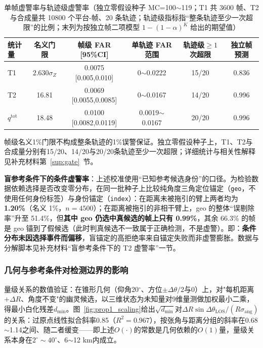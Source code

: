 \documentclass[UTF8,a4paper,zihao=-4]{ctexart}
\begin{document}
\begin{table}[htbp]
\centering
\caption{单帧虚警率与轨迹级虚警率（独立零假设种子 MC=100$\sim$119；T1 共 3600 帧、T2 与合成量共 10800 个平台-帧、20 条轨迹；轨迹级指标指“整条轨迹至少一次超限”的比例；末列为按独立帧二项模型 $1-(1-\alpha)^{K}$ 给出的期望值）}\label{tab:far}
\small
\begin{tabular}{@{}lccccc@{}}
\toprule
统计量 & 名义门限 & 帧级 FAR [95\%CI] & 单轨迹 FAR 范围 & 轨迹级$\ge1$次超限 & 独立帧预测\\
\midrule
T1 & $2.630\sigma_Z$ & 0.0075 [0.005,0.010] & 0$\sim$0.0222 & 15/20 & 0.836\\
T2 & 16.81 & 0.0069 [0.0055,0.0085] & 0$\sim$0.0167 & 14/20 & 0.996\\
$q^{\mathrm{tot}}$ & 18.48 & 0.0100 [0.0082,0.0119] & 0.0019$\sim$0.0167 & 20/20 & 0.996\\
\bottomrule
\end{tabular}
\end{table}

帧级名义1\%门限不构成整条轨迹的1\%误警保证。独立零假设种子上，T1、T2与合成量分别有15/20、14/20与20/20条轨迹至少一次超限；详细统计与相关性解释见补充材料第~\ref{sup:gate}~节。

\textbf{盲参考条件下的条件虚警率}：上述校准使用“已知参考候选身份”的口径。为检验数据依赖选择是否改变零分布，在同一批种子上比较纯角度三角定位锚定（\texttt{geo}，不使用任何身份标签）与身份锚定（\texttt{index}）：在距离未被拖引的臂上两者均为 \textbf{1.20\%}（名义 1\%，$n=4500$）；在距离被拖引的非相干臂上，geo 的整体“误剔除率”升至 51.4\%，但\textbf{其中 geo 仍选中真候选的帧上只有 0.99\%}，其余 66.3\% 的帧是 geo 锚到了假候选（此时判真候选不一致属于正确检测，不是虚警）。即：\textbf{条件分布未因选择事件而偏移}，盲锚定的高拒绝率来自锚定失败而非虚警膨胀。数据与分解脚本见补充材料“盲参考条件下的 T2 虚警率”一节。


\subsubsection{几何与参考条件对检测边界的影响}\label{sec:test-geometry}
量级关系的数值验证：在锥形几何（仰角20\(^\circ\)、方位\(\pm\Delta\theta/2\)与0）上，对"每机距离\(+\Delta R\)、角度不变"的幽灵候选，以三维状态为未知量对9维量测做加权最小二乘，得最小白化残差\(d_{\min}\)。图~\ref{fig:prop1_scaling}给出\(\sqrt{d_{\min}}\)对\(\Delta R\sin\Delta\theta_{\mathrm{LOS}}/(R\sigma_{\mathrm{ang}})\)的关系：过原点线性拟合斜率0.85（\(R^2=0.967\)），按张角与距离分组的斜率在0.68\(\sim\)1.14之间、随二者缓变——即上述\(O(\cdot)\)的常数是几何依赖的\(O(1)\)量，量级关系本身在\(2^\circ\sim40^\circ\)、6\(\sim\)12 km内成立。
\end{document}
